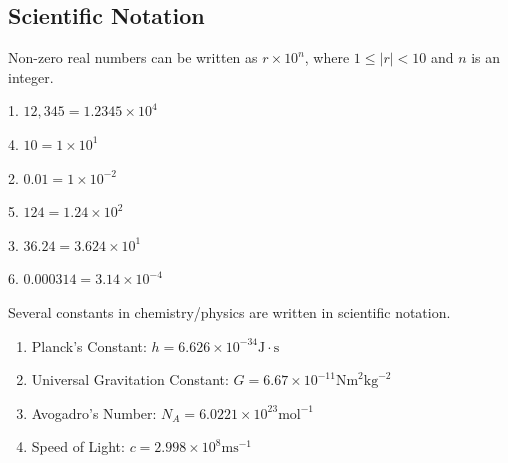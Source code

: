 \documentclass[crop=false,class=book,oneside]{standalone}                      %
\begin{document}
    \subsection{Scientific Notation}
        Non-zero real numbers can be written as
        ${r}\times{10^{n}}$, where ${1}\leq{|r|}<10$
        and $n$ is an integer.
        \begin{fexample}{}{}
            \begin{enumerate}
                \begin{multicols}{3}
                    \item[1.] $12,\!345={1.2345}\times{10^{4}}$
                    \item[4.] $10={1}\times{10^{1}}$
                    \item[2.] $0.01={1}\times{10^{-2}}$
                    \item[5.] $124={1.24}\times{10^{2}}$
                    \item[3.] $36.24={3.624}\times{10^{1}}$
                    \item[6.] $0.000314={3.14}\times{10^{-4}}$
                \end{multicols}
            \end{enumerate}
            Several constants in chemistry/physics are
            written in scientific notation.
            \begin{enumerate}
                \item Planck's Constant:
                    $h={6.626}\times{10^{-34}}%
                    \textrm{J}\cdot\textrm{s}$
                \item Universal Gravitation Constant:
                    $G={6.67}\times{10^{-11}}%
                    \textrm{Nm}^{2}\textrm{kg}^{-2}$
                \item Avogadro's Number:
                    $N_{A}={6.0221}\times{10^{23}}%
                    \textrm{mol}^{-1}$
                \item Speed of Light:
                    $c={2.998}\times{10^{8}\textrm{ms}^{-1}}$
            \end{enumerate}
        \end{fexample}
\end{document}
